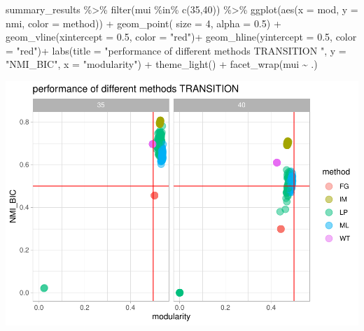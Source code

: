 \documentclass[
]{article}
\newenvironment{Shaded}{\begin{snugshade}}{\end{snugshade}}
\newcommand{\AttributeTok}[1]{\textcolor[rgb]{0.77,0.63,0.00}{#1}}
\newcommand{\DecValTok}[1]{\textcolor[rgb]{0.00,0.00,0.81}{#1}}
\newcommand{\FloatTok}[1]{\textcolor[rgb]{0.00,0.00,0.81}{#1}}
\newcommand{\FunctionTok}[1]{\textcolor[rgb]{0.00,0.00,0.00}{#1}}
\newcommand{\NormalTok}[1]{#1}
\newcommand{\SpecialCharTok}[1]{\textcolor[rgb]{0.00,0.00,0.00}{#1}}
\newcommand{\StringTok}[1]{\textcolor[rgb]{0.31,0.60,0.02}{#1}}
\begin{document}
\begin{Shaded}
\begin{Highlighting}[]
\NormalTok{summary\_results }\SpecialCharTok{\%\textgreater{}\%} 
  \FunctionTok{filter}\NormalTok{(mui }\SpecialCharTok{\%in\%} \FunctionTok{c}\NormalTok{(}\DecValTok{35}\NormalTok{,}\DecValTok{40}\NormalTok{)) }\SpecialCharTok{\%\textgreater{}\%} 
  \FunctionTok{ggplot}\NormalTok{(}\FunctionTok{aes}\NormalTok{(}\AttributeTok{x =}\NormalTok{ mod, }\AttributeTok{y =}\NormalTok{ nmi, }\AttributeTok{color =}\NormalTok{ method)) }\SpecialCharTok{+}
  \FunctionTok{geom\_point}\NormalTok{( }\AttributeTok{size =} \DecValTok{4}\NormalTok{, }\AttributeTok{alpha =} \FloatTok{0.5}\NormalTok{) }\SpecialCharTok{+}
  \FunctionTok{geom\_vline}\NormalTok{(}\AttributeTok{xintercept =} \FloatTok{0.5}\NormalTok{, }\AttributeTok{color =} \StringTok{"red"}\NormalTok{)}\SpecialCharTok{+}
  \FunctionTok{geom\_hline}\NormalTok{(}\AttributeTok{yintercept =} \FloatTok{0.5}\NormalTok{, }\AttributeTok{color =} \StringTok{"red"}\NormalTok{)}\SpecialCharTok{+}
  \FunctionTok{labs}\NormalTok{(}\AttributeTok{title =} \StringTok{"performance of different methods TRANSITION "}\NormalTok{, }\AttributeTok{y =} \StringTok{"NMI\_BIC"}\NormalTok{, }\AttributeTok{x =} \StringTok{"modularity"}\NormalTok{) }\SpecialCharTok{+}
  \FunctionTok{theme\_light}\NormalTok{()  }\SpecialCharTok{+} \FunctionTok{facet\_wrap}\NormalTok{(mui }\SpecialCharTok{\textasciitilde{}}\NormalTok{ .)}
\end{Highlighting}
\end{Shaded}

\includegraphics{com_det_algorithms_files/figure-latex/unnamed-chunk-18-1.pdf}
\end{document}
